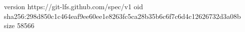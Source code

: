 version https://git-lfs.github.com/spec/v1
oid sha256:298d850c1c464eaf9ee60ee1e8263fc5ca28b35b6c6f7c6d4c12626732d3a08b
size 58566
